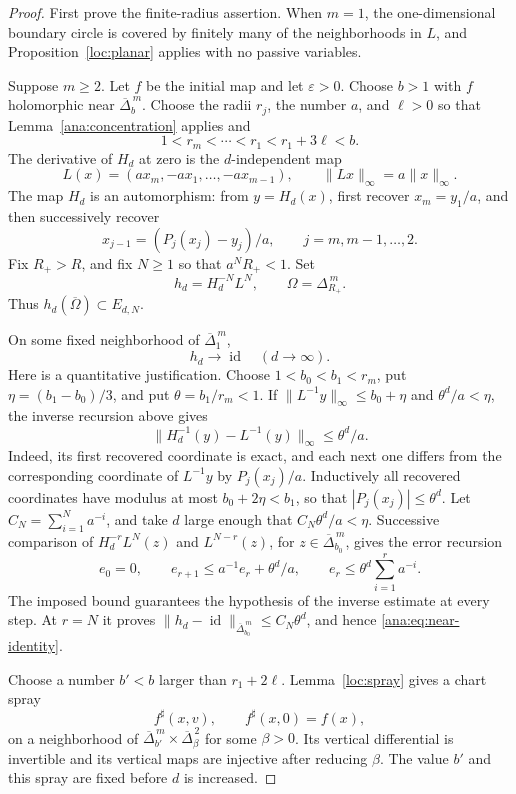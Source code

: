 \begin{proof}
First prove the finite-radius assertion.  When \(m=1\), the
one-dimensional boundary circle is covered by finitely many of
the neighborhoods in \(L\), and Proposition~\ref{loc:planar}
applies with no passive variables.

Suppose \(m\geq2\).  Let \(f\) be the initial map and let
\(\varepsilon>0\).  Choose \(b>1\) with \(f\) holomorphic near
\(\overline\Delta_b^{\,m}\).  Choose the radii \(r_j\), the number
\(a\), and \(\ell>0\) so that Lemma~\ref{ana:concentration} applies
and
\[
 1<r_m<\cdots<r_1<r_1+3\ell<b.
\]
The derivative of \(H_d\) at zero is the \(d\)-independent map
\[
 L(x)=(a x_m,-a x_1,\ldots,-a x_{m-1}),
 \qquad \|Lx\|_\infty=a\|x\|_\infty.
\]
The map \(H_d\) is an automorphism: from \(y=H_d(x)\), first recover
\(x_m=y_1/a\), and then successively recover
\[
 x_{j-1}=(P_j(x_j)-y_j)/a,\qquad j=m,m-1,\ldots,2.
\]
Fix \(R_+>R\), and fix \(N\geq1\) so that \(a^N R_+<1\).
Set
\[
 h_d=H_d^{-N}L^N,\qquad \Omega=\Delta_{R_+}^{\,m}.
\]
Thus \(h_d(\overline\Omega)\subset E_{d,N}\).

On some fixed neighborhood of \(\overline\Delta_1^{\,m}\),
\begin{equation}\label{ana:eq:near-identity}
 h_d\longrightarrow\operatorname{id}\quad(d\longrightarrow\infty).
\end{equation}
Here is a quantitative justification.  Choose
\(1<b_0<b_1<r_m\), put
\(\eta=(b_1-b_0)/3\), and put \(\theta=b_1/r_m<1\).
If \(\|L^{-1}y\|_\infty\leq b_0+\eta\) and
\(\theta^d/a<\eta\), the inverse recursion above gives
\[
 \|H_d^{-1}(y)-L^{-1}(y)\|_\infty\leq\theta^d/a.
\]
Indeed, its first recovered coordinate is exact, and each next
one differs from the corresponding coordinate of \(L^{-1}y\)
by \(P_j(x_j)/a\).  Inductively all recovered coordinates have
modulus at most \(b_0+2\eta<b_1\), so that
\(|P_j(x_j)|\leq\theta^d\).
Let \(C_N=\sum_{i=1}^N a^{-i}\), and take \(d\) large enough
that \(C_N\theta^d/a<\eta\).  Successive comparison of
\(H_d^{-r}L^N(z)\) and \(L^{N-r}(z)\), for
\(z\in\overline\Delta_{b_0}^{\,m}\), gives the error recursion
\[
 e_0=0,\qquad e_{r+1}\leq a^{-1}e_r+\theta^d/a,\qquad
 e_r\leq\theta^d\sum_{i=1}^r a^{-i}.
\]
The imposed bound guarantees the hypothesis of the inverse
estimate at every step.  At \(r=N\) it proves
\(\|h_d-\operatorname{id}\|_{\overline\Delta_{b_0}^{\,m}}
\leq C_N\theta^d\), and hence \eqref{ana:eq:near-identity}.

Choose a number \(b'<b\) larger than \(r_1+2\ell\).
Lemma~\ref{loc:spray} gives a chart spray
\[
 f^\sharp(x,v),\qquad f^\sharp(x,0)=f(x),
\]
on a neighborhood of
\(\overline\Delta_{b'}^{\,m}\times\overline\Delta_\beta^{\,2}\)
for some \(\beta>0\).  Its vertical differential is invertible and
its vertical maps are injective after reducing \(\beta\).
The value \(b'\) and this spray are fixed before \(d\) is increased.


\end{proof}
